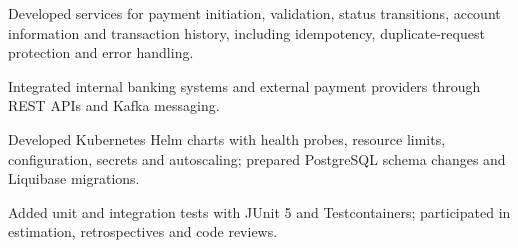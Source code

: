 \begin{cventries}
{\begin{cvitems}
\item Developed services for payment initiation, validation, status transitions, account information and transaction history, including idempotency, duplicate-request protection and error handling.
\item Integrated internal banking systems and external payment providers through REST APIs and Kafka messaging.
\item Developed Kubernetes Helm charts with health probes, resource limits, configuration, secrets and autoscaling; prepared PostgreSQL schema changes and Liquibase migrations.
\item Added unit and integration tests with JUnit 5 and Testcontainers; participated in estimation, retrospectives and code reviews.
\end{cvitems}}
\end{cventries}
